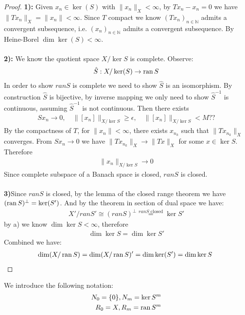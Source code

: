 \begin{proof}
\textbf{1):} Given $x_n \in \ker(S)$ with $\|x_n\|_X < \infty$, by $Tx_n - x_n = 0$ we have $\|Tx_n\|_X = \|x_n\| < \infty$. Since $T$ compact we know $(Tx_n)_{n \in \mathbb{N}}$ admits a convergent subsequence, i.e. $(x_n)_{n \in \mathbb{N}}$ admits a convergent subsequence. By Heine-Borel $\dim \ker(S) < \infty$.\\\\
\textbf{2):} We know the quotient space $X\slash \ker S$ is complete. Observe:
\begin{align*}
	\hat{S}: X\slash \ker(S) \rightarrow \operatorname{ran} S
\end{align*}
In order to show $ran S$ is complete we need to show $\hat{S}$ is an isomorphism. By construction $\hat{S}$ is bijective, by inverse mapping we only need to show $\hat{S}^{-1}$ is continuous, assuming $\hat{S}^{-1}$ is not continuous. Then there exists
\begin{align*}
	Sx_n \rightarrow 0, \quad \|[x_n]\|_{X\slash \ker S} \geq \epsilon,\quad \|[x_n]\|_{X\slash \ker S} < M  ??
\end{align*}
	By the compactness of $T$, for $\|x_n\|< \infty$, there exists $x_{n_k}$ such that $\|T x_{n_k}\|_X $ converges. From $Sx_n \rightarrow 0$ we have $\|T x_{n_k}\|_X \rightarrow \|Tx\|_X$ for some $x \in \ker S$. Therefore
\begin{align*}
	\|x_n\|_{X\slash \ker S} \rightarrow 0
\end{align*}
Since complete subspace of a Banach space is closed, $ran S$ is closed.\\
\\
\textbf{3)}Since $ran S$ is closed, by the lemma of the closed range theorem we have $(\operatorname{ran} S)^\perp = \ker(S')$.
And by the theorem in section of dual space we have:
\begin{align*}
	X'\slash ranS' \cong (ranS)^\perp \overset{ranS\text{ closed}}{=} \ker S'
\end{align*}
by a) we know $\dim \ker S < \infty$, therefore
\begin{align*}
	\dim \ker S = \dim \ker S'
\end{align*}
Combined we have:
\begin{align*}
	\dim (X\slash \operatorname{ran} S) = \dim (X\slash \operatorname{ran} S)' = \dim \ker( S') = \dim \ker S \
\end{align*}
\end{proof}

We introduce the following notation:
\begin{align*}
	N_0 = \{0\}, N_m = \ker S^m\\
	R_0 = X, R_m = \operatorname{ran} S^m
\end{align*}

